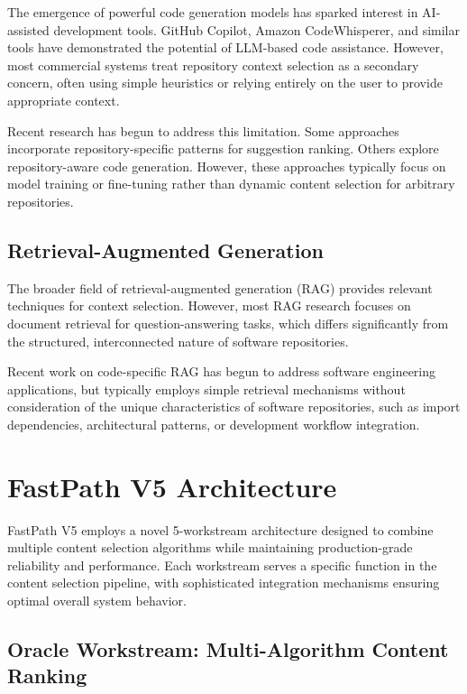 \documentclass[conference]{IEEEtran}
\begin{document}
The emergence of powerful code generation models has sparked interest in AI-assisted development tools. GitHub Copilot, Amazon CodeWhisperer, and similar tools have demonstrated the potential of LLM-based code assistance. However, most commercial systems treat repository context selection as a secondary concern, often using simple heuristics or relying entirely on the user to provide appropriate context.

Recent research has begun to address this limitation. Some approaches incorporate repository-specific patterns for suggestion ranking. Others explore repository-aware code generation. However, these approaches typically focus on model training or fine-tuning rather than dynamic content selection for arbitrary repositories.

\subsection{Retrieval-Augmented Generation}

The broader field of retrieval-augmented generation (RAG) provides relevant techniques for context selection. However, most RAG research focuses on document retrieval for question-answering tasks, which differs significantly from the structured, interconnected nature of software repositories.

Recent work on code-specific RAG has begun to address software engineering applications, but typically employs simple retrieval mechanisms without consideration of the unique characteristics of software repositories, such as import dependencies, architectural patterns, or development workflow integration.

\section{FastPath V5 Architecture}

FastPath V5 employs a novel 5-workstream architecture designed to combine multiple content selection algorithms while maintaining production-grade reliability and performance. Each workstream serves a specific function in the content selection pipeline, with sophisticated integration mechanisms ensuring optimal overall system behavior.

\subsection{Oracle Workstream: Multi-Algorithm Content Ranking}
\end{document}
